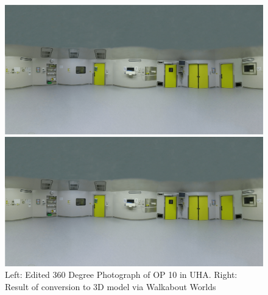 \begin{figure}
    \centering
    \begin{minipage}{.5\textwidth}
      \centering
      \includegraphics[width=0.95\linewidth]{images/implementation/operating_room_360.png}
    \end{minipage}%
    \begin{minipage}{.5\textwidth}
      \centering
      \includegraphics[width=0.95\linewidth]{images/implementation/operating_room_360.png}
    \end{minipage}
    \caption{\label{fig::360OperatingRoom}Left: Edited 360 Degree Photograph of OP 10 in UHA. Right: Result of conversion to 3D model via Walkabout Worlds}
\end{figure}